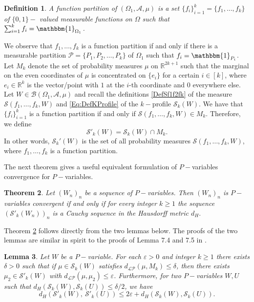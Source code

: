 \documentclass[11pt]{article}
\newtheorem{theorem}{Theorem}[section]
\newtheorem{lemma}[theorem]{Lemma}
\newtheorem{definition}[theorem]{Definition}
\newcommand{\cA}{{\mathcal A}}  %
\newcommand{\cB}{{\mathcal B}}  %
\begin{document}
\begin{definition}
A function partition of $(\Omega_1,\mathcal{A},\mu)$ is a set $\{f_i\}_{i=1}^k=\{f_1,\ldots,f_k\}$ of $\{0,1\}-$ valued measurable functions on $\Omega$ such that $\sum_{i=1}^k f_i=\mathbbm{1}_{\Omega_1}$. 
\end{definition}

We observe that $f_1,\ldots,f_k$ is a function partition if and only if there is a measurable partition $\mathcal{P}=\{P_1,P_2,\dots,P_k\}$ of $\Omega_1$ such that $f_i=\mathbbm{1}_{P_i}$. Let $M_k$ denote the set of probability measures $\mu$ on $\mathbb{R}^{2k+1}$ such that the marginal on the even coordinates of $\mu$ is concentrated on $\{e_i\}$ for a certain $i\in [k]$, where $e_i\in\mathbb{R}^{k}$ is the vector/point with $1$ at the $i$-th coordinate and $0$ everywhere else. Let $W\in\cB(\Omega_1,\cA,\mu)$ and recall the definitions \eqref{DefSf1f2fk} of the measure $\mathcal{S}(f_1,\ldots, f_k,W)$  and \eqref{Eq:DefKProfile} of the $k-$profile $\mathcal{S}_k(W)$. We have that $\{f_i\}_{i=1}^k$ is a function partition if and only if $\mathcal{S}(f_1,\ldots, f_k,W)\in M_k$. Therefore, we define 
\begin{equation}
    \mathcal{S}'_k(W)=\mathcal{S}_k(W)\cap M_k.
\end{equation} In other words, $\mathcal{S}_k'(W)$ is the set of all probability measures $\mathcal{S}(f_1,\ldots, f_k,W)$, where $f_1,\ldots,f_k$ is a function partition.

The next theorem gives a useful equivalent formulation of $P-$variables convergence for $P-$variables. 

\begin{theorem}\label{partthm} Let $(W_n)_n$ be a sequence of $P-$variables. Then $(W_n)_n$ is $P-$variables convergent if and only if for every integer $k\geq 1$ the sequence $(\mathcal{S}'_k(W_n))_{n}$ is a Cauchy sequence in the Hausdorff metric $d_H.$
\end{theorem}

Theorem \ref{partthm} follows directly from the two lemmas below.  The proofs of the two lemmas are similar in spirit to the proofs of Lemma  7.4 and 7.5 in \cite{backhausz2018action}.

\begin{lemma}\label{partlem} Let $W$ be a $P-$variable. For each $\varepsilon>0$ and integer $k\geq 1$ there exists $\delta>0$ such that if  $\mu\in\mathcal{S}_k(W)$ satisfies $d_{\mathcal{LP}}(\mu,M_k)\leq\delta$, then there exists $\mu_2\in\mathcal{S}'_k(W)$ with $d_{\mathcal{LP}}(\mu,\mu_2)\leq\varepsilon$. Furthermore, for two $P-$variables $W,U$ such that $d_H(\mathcal{S}_k(W),\mathcal{S}_k(U))\leq\delta/2$, we have $$d_H(\mathcal{S}'_k(W),~\mathcal{S}'_k(U))\leq 2\varepsilon+d_H(\mathcal{S}_k(W),\mathcal{S}_k(U)).$$
\end{lemma}
\end{document}
